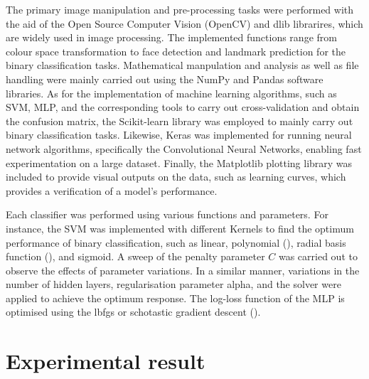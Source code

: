 \documentclass[conference]{IEEEtran}
\begin{document}
The primary image manipulation and pre-processing tasks were performed with the aid of the Open Source Computer Vision (OpenCV) and dlib librarires, which are widely used in image processing. The implemented functions range from colour space transformation to face detection and landmark prediction for the binary classification tasks. Mathematical manpulation and analysis as well as file handling were mainly carried out using the NumPy and Pandas software libraries.
As for the implementation of machine learning algorithms, such as SVM, MLP, and the corresponding tools to carry out cross-validation and obtain the confusion matrix, the Scikit-learn library was employed to mainly carry out binary classification tasks. 
Likewise, Keras was implemented for running neural network algorithms, specifically the Convolutional Neural Networks, enabling fast experimentation on a large dataset.
Finally, the Matplotlib plotting library was included to provide visual outputs on the data, such as learning curves, which provides a verification of a model's performance.

Each classifier was performed using various functions and parameters. For instance, the SVM was implemented with different Kernels to find the optimum performance of binary classification, such as linear, polynomial (), radial basis function (), and sigmoid. A sweep of the penalty parameter $C$ was carried out to observe the effects of parameter variations.
In a similar manner, variations in the number of hidden layers, regularisation parameter alpha, and the solver were applied to achieve the optimum response. The log-loss function of the MLP is optimised using the lbfgs or schotastic gradient descent ().



\section{Experimental result} \label{s-exp-res}


\end{document}
